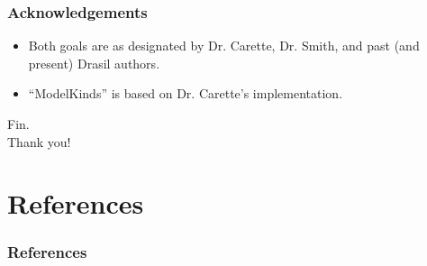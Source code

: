 \documentclass{beamer}
\begin{document}

\begin{frame}
    \frametitle{Acknowledgements}

    \begin{itemize}
        \item<2-> Both goals are as designated by Dr. Carette, Dr. Smith, and past (and present) Drasil authors.
        \item<3-> ``ModelKinds'' is based on Dr. Carette's implementation.
    \end{itemize}
\end{frame}


\begin{frame}
    \center
    \huge{Fin.}\\
    \normalsize{Thank you!}
\end{frame}


\section{References}

\begin{frame}[allowframebreaks]
    \frametitle{References}

    
    
\end{frame}
\end{document}
